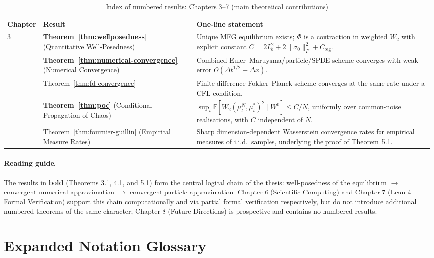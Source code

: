 \begin{table}[ht]
\centering
\small
\caption{Index of numbered results: Chapters 3--7 (main theoretical contributions)}
\label{tab:appC-theorem-index-ch3to8}
\begin{tabular}{p{1.7cm}p{3.1cm}p{7.8cm}}
\toprule
\textbf{Chapter} & \textbf{Result} & \textbf{One-line statement} \\
\midrule
3 & \textbf{Theorem~\ref{thm:wellposedness}} (Quantitative Well-Posedness) &
    Unique MFG equilibrium exists; $\Phi$ is a contraction in weighted $W_2$ with
    explicit constant $C = 2L_b^2 + 2\|\sigma_0\|_F^2 + C_{\mathrm{reg}}$. \\
\addlinespace
4 & \textbf{Theorem~\ref{thm:numerical-convergence}} (Numerical Convergence) &
    Combined Euler--Maruyama/particle/SPDE scheme converges with weak error
    $O(\Delta t^{1/2} + \Delta x)$. \\
\addlinespace
4 & Theorem~\ref{thm:fd-convergence} & Finite-difference Fokker--Planck scheme
    converges at the same rate under a CFL condition. \\
\addlinespace
5 & \textbf{Theorem~\ref{thm:poc}} (Conditional Propagation of Chaos) &
    $\sup_t \mathbb{E}[W_2(\mu_t^N,\mu_t^*)^2 \mid W^0] \le C/N$, uniformly over
    common-noise realisations, with $C$ independent of $N$. \\
\addlinespace
5 & Theorem~\ref{thm:fournier-guillin} (Empirical Measure Rates) & Sharp
    dimension-dependent Wasserstein convergence rates for empirical measures of
    i.i.d.\ samples, underlying the proof of Theorem~5.1. \\
\bottomrule
\end{tabular}
\end{table}

\paragraph{Reading guide.} The results in \textbf{bold} (Theorems 3.1, 4.1, and 5.1)
form the central logical chain of the thesis: well-posedness of the equilibrium
$\to$ convergent numerical approximation $\to$ convergent particle
approximation. Chapter 6 (Scientific Computing) and Chapter 7 (Lean 4 Formal
Verification) support this chain computationally and via partial formal
verification respectively, but do not introduce additional numbered theorems of
the same character; Chapter 8 (Future Directions) is prospective and contains no
numbered results.


\section{Expanded Notation Glossary}
\label{sec:appC-notation}

